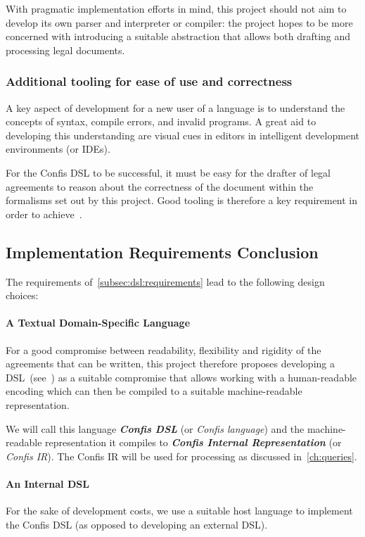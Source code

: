 With pragmatic implementation efforts in mind, this project should not aim to develop its own parser and interpreter or compiler: the project hopes to be more concerned with introducing a suitable abstraction that allows both drafting and processing legal documents.

\subsubsection{Additional tooling for ease of use and correctness}

A key aspect of development for a new user of a language is to understand the concepts of syntax, compile errors, and invalid programs.
A great aid to developing this understanding are visual cues in editors in intelligent development environments (or IDEs).

For the Confis DSL to be successful, it must be easy for the drafter of legal agreements to reason about the correctness of the document within the formalisms set out by this project.
Good tooling is therefore a key requirement in order to achieve~.

\subsection{Implementation Requirements Conclusion}\label{subsec:dsl-design-conclusion}

The requirements of~\autoref{subsec:dsl:requirements} lead to the following design choices:

\paragraph{A Textual Domain-Specific Language} For a good compromise between readability, flexibility and rigidity of the agreements that can be written, this project therefore proposes developing a DSL~(see~) as a suitable compromise that allows working with a human-readable encoding which can then be compiled to a suitable machine-readable representation.

We will call this language \textbf{\emph{Confis DSL}} (or \emph{Confis language}) and the machine-readable representation it compiles to \textbf{\emph{Confis Internal Representation}} (or \emph{Confis IR}).
The Confis IR will be used for processing as discussed in~\autoref{ch:queries}.

\paragraph{An Internal DSL}
For the sake of development costs, we use a suitable host language to implement the Confis DSL (as opposed to developing an external DSL).

